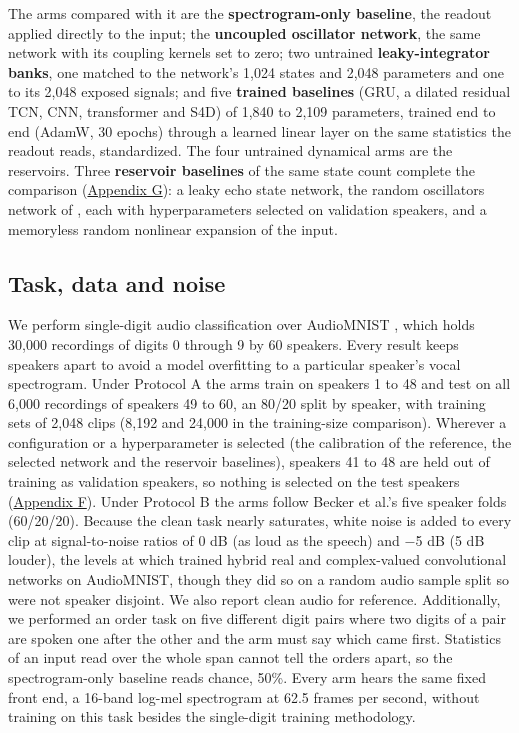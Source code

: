 \documentclass{article}
\begin{document}
The arms compared with it are the \textbf{spectrogram-only baseline},
the readout applied directly to the input; the \textbf{uncoupled
oscillator network}, the same network with its coupling kernels set to
zero; two untrained \textbf{leaky-integrator banks}, one matched to the
network's 1,024 states and 2,048 parameters and one to its 2,048 exposed
signals; and five \textbf{trained baselines} (GRU, a dilated residual
TCN, CNN, transformer and S4D) of 1,840 to 2,109 parameters, trained end
to end (AdamW, 30 epochs) through a learned linear layer on the same
statistics the readout reads, standardized. The four untrained dynamical
arms are the reservoirs. Three \textbf{reservoir baselines} of the same
state count complete the comparison (\hyperref[sec-G]{Appendix G}): a
leaky echo state network, the random oscillators network of
\citet{ceni2024}, each with hyperparameters selected on validation
speakers, and a memoryless random nonlinear expansion of the input.

\subsection{Task, data and noise}\label{sec-3-2}

We perform single-digit audio classification over AudioMNIST
\citep{becker2024}, which holds 30,000 recordings of digits 0 through 9
by 60 speakers. Every result keeps speakers apart to avoid a model
overfitting to a particular speaker's vocal spectrogram. Under Protocol
A the arms train on speakers 1 to 48 and test on all 6,000 recordings of
speakers 49 to 60, an 80/20 split by speaker, with training sets of
2,048 clips (8,192 and 24,000 in the training-size comparison). Wherever
a configuration or a hyperparameter is selected (the calibration of the
reference, the selected network and the reservoir baselines), speakers
41 to 48 are held out of training as validation speakers, so nothing is
selected on the test speakers (\hyperref[sec-F]{Appendix F}). Under
Protocol B the arms follow Becker et al.'s five speaker folds
(60/20/20). Because the clean task nearly saturates, white noise is
added to every clip at signal-to-noise ratios of 0 dB (as loud as the
speech) and \ensuremath{-}5 dB (5 dB louder), the levels at which
\citet{young2026} trained hybrid real and complex-valued convolutional
networks on AudioMNIST, though they did so on a random audio sample
split so were not speaker disjoint. We also report clean audio for
reference. Additionally, we performed an order task on five different
digit pairs where two digits of a pair are spoken one after the other
and the arm must say which came first. Statistics of an input read over
the whole span cannot tell the orders apart, so the spectrogram-only
baseline reads chance, 50\%. Every arm hears the same fixed front end, a
16-band log-mel spectrogram at 62.5 frames per second, without training
on this task besides the single-digit training methodology.
\end{document}
